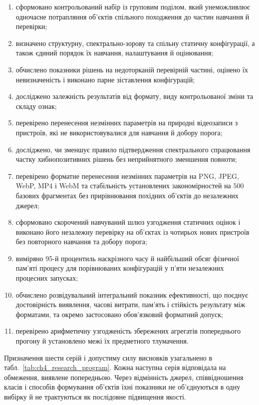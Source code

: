 \begin{enumerate}
\item сформовано контрольований набір із груповим поділом, який унеможливлює одночасне потрапляння об’єктів спільного походження до частин навчання й перевірки;
\item визначено структурну, спектрально-зорову та спільну статичну конфігурації, а також єдиний порядок їх навчання, налаштування й оцінювання;
\item обчислено показники рішень на недоторканій перевірній частині, оцінено їх невизначеність і виконано парне зіставлення конфігурацій;
\item досліджено залежність результатів від формату, виду контрольованої зміни та складу ознак;
\item перевірено перенесення незмінних параметрів на природні відеозаписи з пристроїв, які не використовувалися для навчання й добору порога;
\item досліджено, чи зменшує правило підтвердження спектрального спрацювання частку хибнопозитивних рішень без неприйнятного зменшення повноти;
\item перевірено форматне перенесення незмінних параметрів на PNG, JPEG, WebP, MP4 і WebM та стабільність установлених закономірностей на $500$ базових фрагментах без прирівнювання похідних об’єктів до незалежних джерел;
\item сформовано скорочений навчуваний шлюз узгодження статичних оцінок і виконано його незалежну перевірку на об’єктах із чотирьох нових пристроїв без повторного навчання та добору порога;
\item виміряно 95-й процентиль наскрізного часу й найбільший обсяг фізичної пам’яті процесу для порівнюваних конфігурацій у п’яти незалежних процесних запусках;
\item обчислено розвідувальний інтегральний показник ефективності, що поєднує достовірність виявлення, часові витрати, пам’ять і стійкість результату між форматами, та окремо застосовано обов’язковий форматний допуск;
\item перевірено арифметичну узгодженість збережених агрегатів попереднього прогону й установлено межі їх предметного тлумачення.
\end{enumerate}

Призначення шести серій і допустиму силу висновків узагальнено в табл.~\ref{tab:ch4_research_program}. Кожна наступна серія відповідала на обмеження, виявлене попередньою. Через відмінність джерел, співвідношення класів і способів формування об’єктів їхні показники не об’єднуються в одну вибірку й не трактуються як послідовне підвищення якості.


